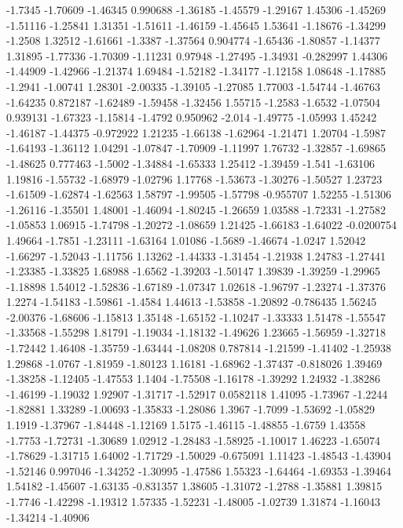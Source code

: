 \documentclass[9pt]{article}
\theoremstyle{plain}
\theoremstyle{definition}
\theoremstyle{remark}
\numberwithin{equation}{section}
\begin{document}
-1.7345
-1.70609
-1.46345
0.990688
-1.36185
-1.45579
-1.29167
1.45306
-1.45269
-1.51116
-1.25841
1.31351
-1.51611
-1.46159
-1.45645
1.53641
-1.18676
-1.34299
-1.2508
1.32512
-1.61661
-1.3387
-1.37564
0.904774
-1.65436
-1.80857
-1.14377
1.31895
-1.77336
-1.70309
-1.11231
0.97948
-1.27495
-1.34931
-0.282997
1.44306
-1.44909
-1.42966
-1.21374
1.69484
-1.52182
-1.34177
-1.12158
1.08648
-1.17885
-1.2941
-1.00741
1.28301
-2.00335
-1.39105
-1.27085
1.77003
-1.54744
-1.46763
-1.64235
0.872187
-1.62489
-1.59458
-1.32456
1.55715
-1.2583
-1.6532
-1.07504
0.939131
-1.67323
-1.15814
-1.4792
0.950962
-2.014
-1.49775
-1.05993
1.45242
-1.46187
-1.44375
-0.972922
1.21235
-1.66138
-1.62964
-1.21471
1.20704
-1.5987
-1.64193
-1.36112
1.04291
-1.07847
-1.70909
-1.11997
1.76732
-1.32857
-1.69865
-1.48625
0.777463
-1.5002
-1.34884
-1.65333
1.25412
-1.39459
-1.541
-1.63106
1.19816
-1.55732
-1.68979
-1.02796
1.17768
-1.53673
-1.30276
-1.50527
1.23723
-1.61509
-1.62874
-1.62563
1.58797
-1.99505
-1.57798
-0.955707
1.52255
-1.51306
-1.26116
-1.35501
1.48001
-1.46094
-1.80245
-1.26659
1.03588
-1.72331
-1.27582
-1.05853
1.06915
-1.74798
-1.20272
-1.08659
1.21425
-1.66183
-1.64022
-0.0200754
1.49664
-1.7851
-1.23111
-1.63164
1.01086
-1.5689
-1.46674
-1.0247
1.52042
-1.66297
-1.52043
-1.11756
1.13262
-1.44333
-1.31454
-1.21938
1.24783
-1.27441
-1.23385
-1.33825
1.68988
-1.6562
-1.39203
-1.50147
1.39839
-1.39259
-1.29965
-1.18898
1.54012
-1.52836
-1.67189
-1.07347
1.02618
-1.96797
-1.23274
-1.37376
1.2274
-1.54183
-1.59861
-1.4584
1.44613
-1.53858
-1.20892
-0.786435
1.56245
-2.00376
-1.68606
-1.15813
1.35148
-1.65152
-1.10247
-1.33333
1.51478
-1.55547
-1.33568
-1.55298
1.81791
-1.19034
-1.18132
-1.49626
1.23665
-1.56959
-1.32718
-1.72442
1.46408
-1.35759
-1.63444
-1.08208
0.787814
-1.21599
-1.41402
-1.25938
1.29868
-1.0767
-1.81959
-1.80123
1.16181
-1.68962
-1.37437
-0.818026
1.39469
-1.38258
-1.12405
-1.47553
1.1404
-1.75508
-1.16178
-1.39292
1.24932
-1.38286
-1.46199
-1.19032
1.92907
-1.31717
-1.52917
0.0582118
1.41095
-1.73967
-1.2244
-1.82881
1.33289
-1.00693
-1.35833
-1.28086
1.3967
-1.7099
-1.53692
-1.05829
1.1919
-1.37967
-1.84448
-1.12169
1.5175
-1.46115
-1.48855
-1.6759
1.43558
-1.7753
-1.72731
-1.30689
1.02912
-1.28483
-1.58925
-1.10017
1.46223
-1.65074
-1.78629
-1.31715
1.64002
-1.71729
-1.50029
-0.675091
1.11423
-1.48543
-1.43904
-1.52146
0.997046
-1.34252
-1.30995
-1.47586
1.55323
-1.64464
-1.69353
-1.39464
1.54182
-1.45607
-1.63135
-0.831357
1.38605
-1.31072
-1.2788
-1.35881
1.39815
-1.7746
-1.42298
-1.19312
1.57335
-1.52231
-1.48005
-1.02739
1.31874
-1.16043
-1.34214
-1.40906
\end{document}
